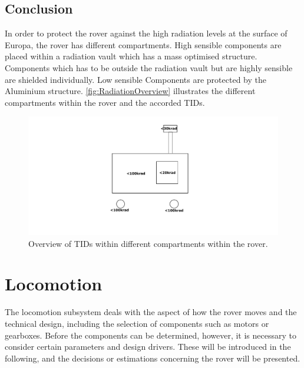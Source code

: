 \subsection{Conclusion}

\label{subsec:RadiationConclusion}

In order to protect the rover against the high radiation levels at the surface of Europa, the rover has different compartments. High sensible components are placed within a radiation vault which has a mass optimised structure. Components which has to be outside the radiation vault but are highly sensible are shielded individually. Low sensible Components are protected by the Aluminium structure. \autoref{fig:RadiationOverview} illustrates the different compartments within the rover and the accorded TIDs.

\begin{figure}[htb]
     \centering
     \includegraphics[width=\textwidth]{Media/RadiationOverview}
     \caption{Overview of TIDs within different compartments within the rover.}
     \label{fig:RadiationOverview}
\end{figure}

\clearpage

\section{Locomotion} \label{sec:locomotion}

The locomotion subsystem deals with the aspect of how the rover moves and the technical design, including the selection of components such as motors or gearboxes. Before the components can be determined, however, it is necessary to consider certain parameters and design drivers. These will be introduced in the following, and the decisions or estimations concerning the rover will be presented.

